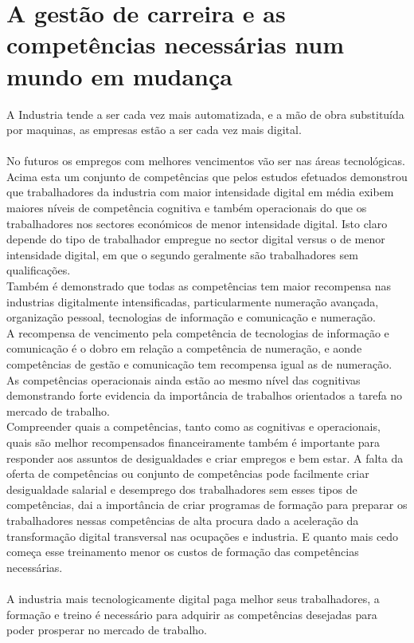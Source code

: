 \section{A gestão de carreira e as competências necessárias num mundo em mudança}
\qquad A Industria tende a ser cada vez mais automatizada, e a mão de obra substituída por maquinas, as empresas estão a ser cada vez mais digital.\\
\\
No futuros os empregos com melhores vencimentos vão ser nas áreas tecnológicas.\\

Acima esta um conjunto de competências que pelos estudos efetuados demonstrou que trabalhadores da industria com maior intensidade digital em média exibem maiores níveis de competência cognitiva e também operacionais do que os trabalhadores nos sectores económicos de menor intensidade digital. Isto claro depende do tipo de trabalhador empregue no sector digital versus o de menor intensidade digital, em que o segundo geralmente são trabalhadores sem qualificações. \cite{article_1}\\
Também é demonstrado que todas as competências tem maior recompensa nas industrias digitalmente intensificadas, particularmente numeração avançada, organização pessoal, tecnologias de informação e comunicação e numeração. \cite{article_1}\\
A recompensa de vencimento pela competência de tecnologias de informação e comunicação é o dobro em relação a competência de numeração, e aonde competências de gestão e comunicação tem recompensa igual as de numeração. \cite{article_1}\\
As competências operacionais ainda estão ao mesmo nível das cognitivas demonstrando forte evidencia da importância de trabalhos orientados a tarefa no mercado de trabalho. \cite{article_1}\\
Compreender quais a competências, tanto como as cognitivas e operacionais, quais são melhor recompensados financeiramente também é importante para responder aos assuntos de  desigualdades e criar empregos e bem estar. A falta da oferta de competências ou conjunto de competências pode facilmente criar desigualdade salarial e desemprego dos trabalhadores sem esses tipos de competências, dai a importância de criar programas de formação para preparar os trabalhadores nessas competências de alta procura dado a aceleração da transformação digital transversal nas ocupações e industria. E quanto mais cedo começa esse treinamento menor os custos de formação das competências necessárias. \cite{article_1}\\
\\
A industria mais tecnologicamente digital paga melhor seus trabalhadores, a formação e treino é necessário para adquirir as competências desejadas para poder prosperar no mercado de trabalho.

\newpage
